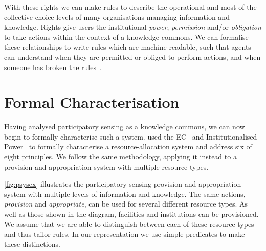 With these rights we can make rules to describe the operational and most of the collective-choice levels of many organisations managing information and knowledge. Rights give users the institutional \emph{power}, \emph{permission} and/or \emph{obligation} to take actions within the context of a knowledge commons. We can formalise these relationships to write rules which are machine readable, such that agents can understand when they are permitted or obliged to perform actions, and when someone has broken the rules~\citep{Artikis2009}.



\section{Formal Characterisation}\label{sec:formalchar}

Having analysed participatory sensing as a knowledge commons, we can now begin to formally characterise such a system.  used the \ac{EC}~\citep{Kowalski1986} and Institutionalised Power~\citep{Jones1996} to formally characterise a resource-allocation system and address six of  eight principles. 
We follow the same methodology, applying it instead to a provision and appropriation system with multiple resource types.

\autoref{fig:psysex} illustrates the participatory-sensing provision and appropriation system with multiple levels of information and knowledge. 
The same actions, \emph{provision} and \emph{appropriate}, can be used for several different resource types. 
As well as those shown in the diagram, facilities and institutions can be provisioned. 
We assume that we are able to distinguish between each of these resource types and thus tailor rules. In our representation we use simple predicates to make these distinctions.

